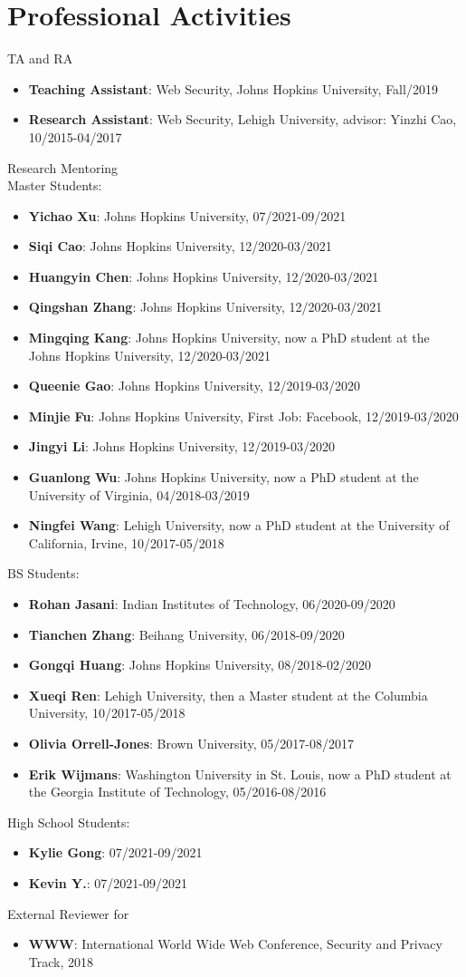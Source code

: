\documentclass[letterpaper,11pt]{article}
\newcommand{\resumeItem}[2]{
  \item\small{
    \textbf{#1}{: #2 \vspace{-2pt}}
  }
}
\newcommand{\resumeItemListStart}{\begin{itemize}}
\newcommand{\resumeItemListEnd}{\end{itemize}\vspace{-5pt}}
\begin{document}
\section{Professional Activities}
TA and RA
\resumeItemListStart
\resumeItem{Teaching Assistant}{Web Security, Johns Hopkins University, Fall/2019}
\resumeItem{Research Assistant}{Web Security, Lehigh University, advisor: Yinzhi Cao, 10/2015-04/2017}
\resumeItemListEnd
Research Mentoring\\
	\quad Master Students:
    \resumeItemListStart
    \resumeItem{Yichao Xu}{ Johns Hopkins University, 07/2021-09/2021}
     \resumeItem{Siqi Cao}{Johns Hopkins University, 12/2020-03/2021}
    \resumeItem{Huangyin Chen}{Johns Hopkins University, 12/2020-03/2021}
    \resumeItem{Qingshan Zhang}{Johns Hopkins University, 12/2020-03/2021}
    \resumeItem{Mingqing Kang}{Johns Hopkins University, now a PhD student at the Johns Hopkins University, 12/2020-03/2021}
    \resumeItem{Queenie Gao}{Johns Hopkins University, 12/2019-03/2020}
    \resumeItem{Minjie Fu}{Johns Hopkins University, First Job: Facebook, 12/2019-03/2020}
    \resumeItem{Jingyi Li}{Johns Hopkins University, 12/2019-03/2020}
    \resumeItem{Guanlong Wu}{Johns Hopkins University, now a PhD student at the University of Virginia, 04/2018-03/2019}
    \resumeItem{Ningfei Wang}{Lehigh University, now a PhD student at the University of California, Irvine, 10/2017-05/2018}
    \resumeItemListEnd
\quad BS Students:
\resumeItemListStart	
	\resumeItem{Rohan Jasani}{Indian Institutes of Technology, 06/2020-09/2020}
	\resumeItem{Tianchen Zhang}{Beihang University, 06/2018-09/2020}
    \resumeItem{Gongqi Huang}{Johns Hopkins University, 08/2018-02/2020}
    \resumeItem{Xueqi Ren}{Lehigh University, then a Master student at the Columbia University, 10/2017-05/2018}    
    \resumeItem{Olivia Orrell-Jones}{Brown University, 05/2017-08/2017}	
    \resumeItem{Erik Wijmans}{Washington University in St. Louis, now a PhD student at the Georgia Institute of Technology, 05/2016-08/2016}	
	\resumeItemListEnd
\quad High School Students:
\resumeItemListStart	
    \resumeItem{Kylie Gong}{07/2021-09/2021}
	\resumeItem{Kevin Y.}{07/2021-09/2021}	
\resumeItemListEnd
External Reviewer for 
    \resumeItemListStart
		\resumeItem{WWW}{International World Wide Web Conference, Security and Privacy Track, 2018}    
	\resumeItemListEnd	
\end{document}
